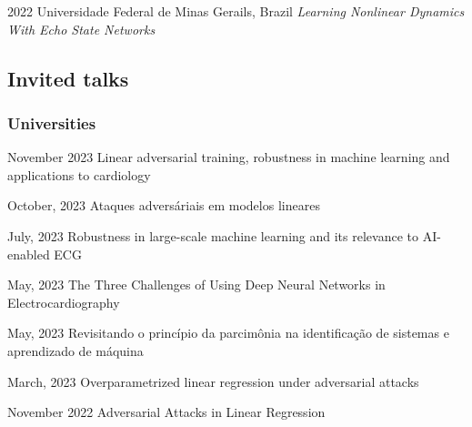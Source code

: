 \documentclass[10pt,letterpaper]{article} %
\begin{document}
    { 2022 }
    {  }
    { Universidade Federal de Minas Gerails, Brazil }
    { {\it Learning Nonlinear Dynamics With Echo State Networks } }



\subsection*{Invited talks}

\subsubsection*{Universities}

    
    { November 2023 }
    { Linear adversarial training, robustness in machine learning and applications to cardiology  }
    { }{}
    

    
    { October, 2023 }
    { Ataques adversáriais em modelos lineares  }
    { }{}
    

    
    { July, 2023 }
    { Robustness in large-scale machine learning and its relevance to AI-enabled ECG  }
    { }{}
    

    
    { May, 2023 }
    { The Three Challenges of Using Deep Neural Networks in Electrocardiography  }
    { }{}
    

    
    { May, 2023 }
    { Revisitando o princípio da parcimônia na identificação de sistemas e aprendizado de máquina  }
    { }{}
    

    
    { March, 2023 }
    { Overparametrized linear regression under adversarial attacks  }
    { }{}
    

    
    { November 2022 }
    { Adversarial Attacks in Linear Regression  }
    { }{}
    
\end{document}
